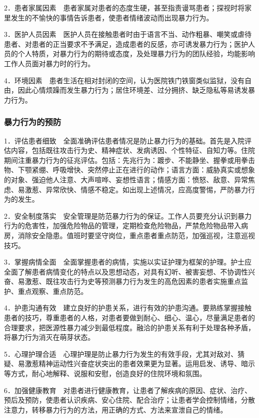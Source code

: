 2．患者家属因素　患者家属对患者的态度生硬，甚至指责谩骂患者；探视时将家里发生的不愉快的事情告诉患者，使患者情绪波动而出现暴力行为。

3．医护人员因素　医护人员在接触患者时由于语言不当、动作粗暴、嘲笑或虐待患者、对患者的正当要求不予满足，造成患者的反感，亦可诱发暴力行为；医护人员的个人特质，对暴力行为的期待或态度，及处理暴力行为的团队经验，均能影响工作人员面对暴力时的行为。

4．环境因素　患者生活在相对封闭的空间，认为医院铁门铁窗类似监狱，没有自由，因此心情烦躁而发生暴力行为；居住环境差、过分拥挤、缺乏隐私等易诱发暴力行为。

\subsubsection{暴力行为的预防}

1．评估患者细致　全面准确评估患者情况是防止暴力行为的基础。首先是入院评估内容，包括既往攻击行为史、精神症状、发病诱因、个性特征、自知力等。住院期间注重暴力行为的征兆评估。包括：先兆行为：踱步、不能静坐、握拳或用拳击物、下颚紧绷、呼吸增快、突然停止正在进行的动作；语言方面：威胁真实或想象的对象、强迫他人注意、大声喧哗、妄想性语言；情感方面：愤怒、敌意、异常焦虑、易激惹、异常欣快、情感不稳定。如出现上述情况，应高度警惕，严防暴力行为的发生。

2．安全制度落实　安全管理是防范暴力行为的保证。工作人员要充分认识到暴力行为的危害性，加强危险物品的管理，定期检查危险物品，严禁危险物品带入病房，消除安全隐患。值班时要坚守岗位，重点患者重点防范，加强巡视，注意巡视技巧。

3．掌握病情全面　全面掌握患者的病情，实施以实证护理为框架的护理。护士应全面了解患者病情变化的特点以及思想动态，对具有幻听、被害妄想、不协调性兴奋、易激惹、既往攻击行为史等预测暴力行为发生的高危因素的患者实施重点监护、重点观察、重点防范。

4．护患沟通有效　建立良好的护患关系，进行有效的护患沟通。要熟练掌握接触患者的技巧，尊重患者的人格，对患者要做到耐心、细心、温心，尽量满足患者的合理要求，把医源性暴力减少到最低程度。融洽的护患关系有利于处理各种矛盾，将暴力行为消灭在萌芽状态。

5．心理护理合适　心理护理是防止暴力行为发生的有效手段，尤其对敌对、猜疑、易激惹精神运动性兴奋症状突出的患者效果更为显著。运用启发、诱导、暗示等方式，耐心地解释、说服和安慰，创造良好的住院环境和氛围。

6．加强健康教育　对患者进行健康教育，让患者了解疾病的原因、症状、治疗、预后及预防，使患者认识疾病、安心住院、配合治疗；让患者学会控制情绪，分散注意力，转移暴力行为的方法，用正确的方式、方法来宣泄自己的情绪。

